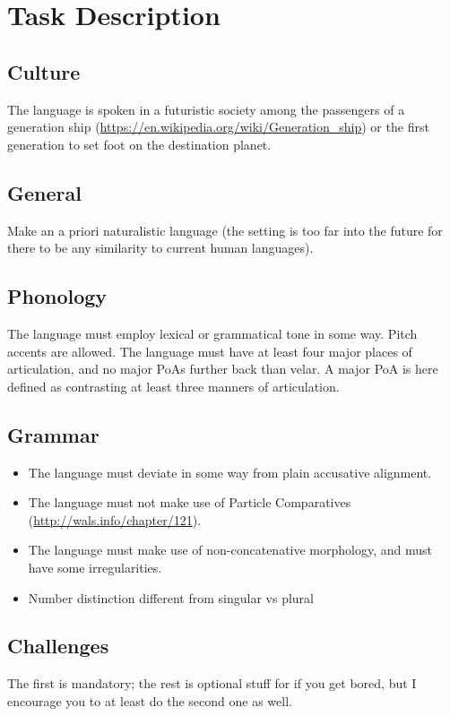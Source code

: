 \chapter{Task Description}

\section{Culture}
The language is spoken in a futuristic society among the passengers of a generation ship (\url{https://en.wikipedia.org/wiki/Generation_ship}) or the first generation to set foot on the destination planet.

\section{General}
Make an a priori naturalistic language (the setting is too far into the future for there to be any similarity to current human languages).

\section{Phonology}
The language must employ lexical or grammatical tone in some way. Pitch accents are allowed. 
The language must have at least four major places of articulation, and no major PoAs further back than velar. A major PoA is here defined as contrasting at least three manners of articulation.

\section{Grammar}

\begin{itemize}
    \item The language must deviate in some way from plain accusative alignment. 
    \item The language must not make use of Particle Comparatives (\url{http://wals.info/chapter/121}). 
    \item The language must make use of non-concatenative morphology, and must have some irregularities.
    \item Number distinction different from singular vs plural    
\end{itemize}

\section{Challenges}
The first is mandatory; the rest is optional stuff for if you get bored, but I encourage you to at least do the second one as well.

